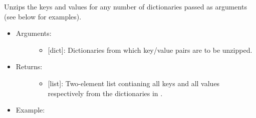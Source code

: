 \documentclass[letterpaper,10pt,english]{sphinxmanual}
\begin{document}
\begin{fulllineitems}
\label{\detokenize{iterables:data_tools.iterables.unzip_dicts}}
Unzips the keys and values for any number of dictionaries passed as
arguments (see below for examples).
\begin{itemize}
\item {} \begin{description}
\item[{Arguments:}] \leavevmode\begin{itemize}
\item {} 
 {[}dict{]}: Dictionaries from which key/value pairs are
to be unzipped.

\end{itemize}

\end{description}

\item {} \begin{description}
\item[{Returns:}] \leavevmode\begin{itemize}
\item {} 
{[}list{]}: Two-element list contianing all keys and all values
respectively from the dictionaries in .

\end{itemize}

\end{description}

\item {} \begin{description}
\item[{Example:}] \leavevmode
\begin{sphinxVerbatim}[commandchars=\\\{\}]
  \PYG{p}{[}   \PYG{p}{]}
  \PYG{p}{[}   \PYG{p}{]}
 
\end{sphinxVerbatim}


\end{description}
\end{itemize}
\end{fulllineitems}
\end{document}
